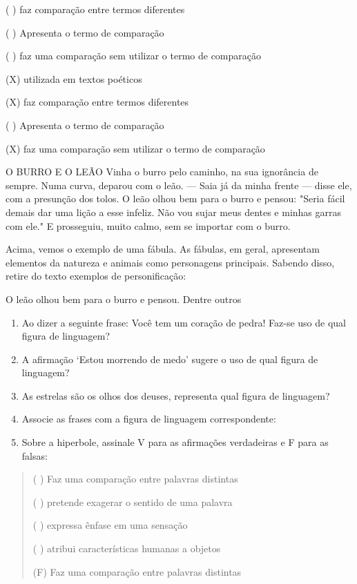 {( ) faz comparação entre termos diferentes

( ) Apresenta o termo de comparação

( ) faz uma comparação sem utilizar o termo de comparação

(X) utilizada em textos poéticos

(X) faz comparação entre termos diferentes

( ) Apresenta o termo de comparação

(X) faz uma comparação sem utilizar o termo de comparação

O BURRO E O LEÃO Vinha o burro pelo caminho, na sua ignorância de
sempre. Numa curva, deparou com o leão. --- Saia já da minha frente ---
disse ele, com a presunção dos tolos. O leão olhou bem para o burro e
pensou: "Seria fácil demais dar uma lição a esse infeliz. Não vou sujar
meus dentes e minhas garras com ele." E prosseguiu, muito calmo, sem se
importar com o burro.

Acima, vemos o exemplo de uma fábula. As fábulas, em geral, apresentam
elementos da natureza e animais como personagens principais. Sabendo
disso, retire do texto exemplos de personificação:

O leão olhou bem para o burro e pensou. Dentre outros

\begin{enumerate}
\def\labelenumi{\arabic{enumi})}
\setcounter{enumi}{2}
\item
  Ao dizer a seguinte frase: Você tem um coração de pedra! Faz-se uso de
  qual figura de linguagem?
\item
  A afirmação `Estou morrendo de medo' sugere o uso de qual figura de
  linguagem?
\item
  As estrelas são os olhos dos deuses, representa qual figura de
  linguagem?
\item
  Associe as frases com a figura de linguagem correspondente:
\item
  Sobre a hiperbole, assinale V para as afirmações verdadeiras e F para
  as falsas:
\end{enumerate}

\begin{quote}
( ) Faz uma comparação entre palavras distintas

( ) pretende exagerar o sentido de uma palavra

( ) expressa ênfase em uma sensação

( ) atribui características humanas a objetos

(F) Faz uma comparação entre palavras distintas


\end{quote}}
